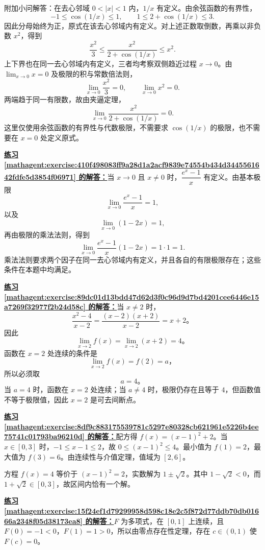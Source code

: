 \documentclass[UTF8,fontset=fandol,11pt]{ctexart}
\begin{document}
附加小问解答：在去心邻域 $0<|x|<1$ 内，$1/x$ 有定义。由余弦函数的有界性，
\[
-1\leq\cos(1/x)\leq1,
\qquad
1\leq2+\cos(1/x)\leq3.
\]
因此分母始终为正，原式在该去心邻域内有定义。对上述正数取倒数，再乘以非负数 $x^2$，得到
\[
\frac{x^2}{3}\leq\frac{x^2}{2+\cos(1/x)}\leq x^2.
\]
上下界也在同一去心邻域内有定义，三者均考察双侧趋近过程 $x\to0$。由 $\lim_{x\to0}x=0$ 及极限的积与常数倍法则，
\[
\lim_{x\to0}\frac{x^2}{3}=0,
\qquad
\lim_{x\to0}x^2=0.
\]
两端趋于同一有限数，故由夹逼定理，
\[
\lim_{x\to0}\frac{x^2}{2+\cos(1/x)}=0.
\]
这里仅使用余弦函数的有界性与代数极限，不需要求 $\cos(1/x)$ 的极限，也不需要在 $x=0$ 处定义原式。\par
\par\noindent\textbf{\hyperref[mathagent:exercise:410f498083ff9a28d1a2acf9839e74554b434d3445561642fdfe5d3854f06971]{练习 \ref*{mathagent:exercise:410f498083ff9a28d1a2acf9839e74554b434d3445561642fdfe5d3854f06971} 的解答：}}当 $x\to0$ 且 $x\neq0$ 时，$\dfrac{e^x-1}{x}$ 有定义。由基本极限
\[
\lim_{x\to0}\frac{e^x-1}{x}=1,
\]
以及
\[
\lim_{x\to0}(1-2x)=1,
\]
再由极限的乘法法则，得到
\[
\lim_{x\to0}\frac{e^x-1}{x}(1-2x)=1\cdot1=1.
\]
乘法法则要求两个因子在同一去心邻域内有定义，并且各自的有限极限存在；这些条件在本题中均满足。\par
\par\noindent\textbf{\hyperref[mathagent:exercise:89dc01d13bdd47d62d3f0c96d9d7bd4201cee6446e15a7269f32977f2b24d58c]{练习 \ref*{mathagent:exercise:89dc01d13bdd47d62d3f0c96d9d7bd4201cee6446e15a7269f32977f2b24d58c} 的解答：}}当 $x\neq2$ 时，
\[
\frac{x^2-4}{x-2}=\frac{(x-2)(x+2)}{x-2}=x+2\text{。}
\]
因此
\[
\lim_{x\to2}f(x)=\lim_{x\to2}(x+2)=4\text{。}
\]
函数在 $x=2$ 处连续的条件是
\[
\lim_{x\to2}f(x)=f(2)=a\text{，}
\]
所以必须取
\[
a=4\text{。}
\]
当 $a=4$ 时，函数在 $x=2$ 处连续；当 $a\neq4$ 时，极限仍存在且等于 $4$，但函数值不等于极限值，因此 $x=2$ 是可去间断点。\par
\par\noindent\textbf{\hyperref[mathagent:exercise:8df9c883175539781c5297e80328cb621961e5226b4ee75741c01793ba96210d]{练习 \ref*{mathagent:exercise:8df9c883175539781c5297e80328cb621961e5226b4ee75741c01793ba96210d} 的解答：}}配方得 $f(x)=(x-1)^2+2$。当 $x\in[0,3]$ 时，$-1\leq x-1\leq2$，故 $0\leq(x-1)^2\leq4$。最小值为 $f(1)=2$，最大值为 $f(3)=6$。由连续性与介值定理，值域为 $[2,6]$。

方程 $f(x)=4$ 等价于 $(x-1)^2=2$，实数解为 $1\pm\sqrt{2}$。其中 $1-\sqrt{2}<0$，而 $1+\sqrt{2}\in[0,3]$，故区间内恰有一个解。\par
\par\noindent\textbf{\hyperref[mathagent:exercise:15f24ef1d79299958d598c18e2c5f872d77ddb70db01666a2348f05d38173ea8]{练习 \ref*{mathagent:exercise:15f24ef1d79299958d598c18e2c5f872d77ddb70db01666a2348f05d38173ea8} 的解答：}}$F$ 为多项式，在 $[0,1]$ 上连续，且 $F(0)=-1<0$，$F(1)=1>0$，所以由零点存在性定理，存在 $c\in(0,1)$ 使 $F(c)=0$。
\end{document}
